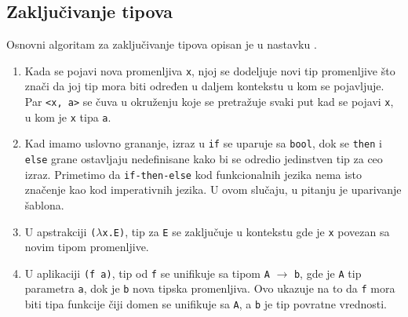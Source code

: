 \subsection{Zaključivanje tipova}
\label{subsec: zakljucivanje tipova}

Osnovni algoritam za zaključivanje tipova opisan je u nastavku \cite{basic-typechecking}.

\begin{enumerate}
	\item Kada se pojavi nova promenljiva \verb|x|, njoj se dodeljuje novi tip promenljive što znači da joj tip mora biti određen u daljem kontekstu u kom se pojavljuje. Par \verb|<x, a>| se čuva u okruženju koje se pretražuje svaki put kad se pojavi \verb|x|, u kom je \verb|x| tipa \verb|a|.
	
	\item Kad imamo uslovno grananje, izraz u \verb|if| se uparuje sa \verb|bool|, dok se \verb|then| i \verb|else| grane ostavljaju nedefinisane kako bi se odredio jedinstven tip za ceo izraz. Primetimo da \verb|if-then-else| kod funkcionalnih jezika nema isto značenje kao kod imperativnih jezika. U ovom slučaju, u pitanju je uparivanje šablona.
	
	\item U apstrakciji \verb|(|$\lambda$\verb|x.E)|, tip za \verb|E| se zaključuje u kontekstu gde je \verb|x| povezan sa novim tipom promenljive.
	
	\item U aplikaciji \verb|(f a)|, tip od \verb|f| se unifikuje sa tipom \verb|A| $\longrightarrow$ \verb|b|, gde je \verb|A| tip parametra \verb|a|, dok je \verb|b| nova tipska promenljiva. Ovo ukazuje na to da \verb|f| mora biti tipa funkcije čiji domen se unifikuje sa \verb|A|, a \verb|b| je tip povratne vrednosti.
\end{enumerate}
